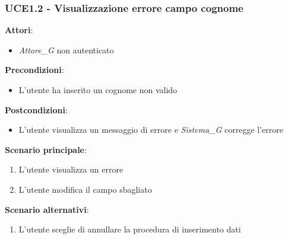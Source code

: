 \subsubsection{UCE1.2 - Visualizzazione errore campo cognome}
\textbf{Attori}:
\begin{itemize}
    \item \textit{Attore_G} non autenticato
\end{itemize}
\textbf{Precondizioni}:
\begin{itemize}
    \item L'utente ha inserito un cognome non valido
\end{itemize}
\textbf{Postcondizioni}:
\begin{itemize}
    \item L'utente visualizza un messaggio di errore e \textit{Sistema_G} corregge l'errore
\end{itemize}
\textbf{Scenario principale}:
\begin{enumerate}
    \item L'utente visualizza un errore 
    \item L'utente modifica il campo sbagliato
\end{enumerate}
\textbf{Scenario alternativi}:
\begin{enumerate}
    \item L'utente sceglie di annullare la procedura di inserimento dati
\end{enumerate}